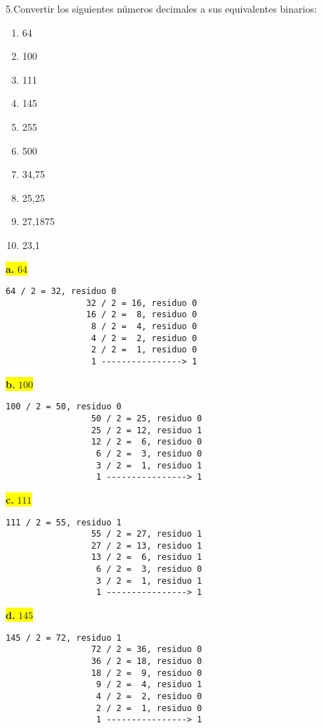 \documentclass[a4paper,12pt]{article}
\begin{document}
	5.Convertir los siguientes números decimales a sus equivalentes binarios:
		\begin{enumerate}
			\item 64 
			\item 100 
			\item 111 
			\item 145 
			\item 255 
			\item 500 
			\item 34,75 
			\item 25,25 
			\item 27,1875 
			\item 23,1
		\end{enumerate}
	
		\newpage
		\begin{center}
			\colorbox{yellow}{{\textbf{a.} $64$}}
			\begin{Verbatim}[formatcom=\centering]
				64 / 2 = 32, residuo 0
				32 / 2 = 16, residuo 0
				16 / 2 =  8, residuo 0
				 8 / 2 =  4, residuo 0
				 4 / 2 =  2, residuo 0
				 2 / 2 =  1, residuo 0
				 1 ----------------> 1
			\end{Verbatim}
		\hspace{1.7cm}
		\end{center}
		\begin{center}
			\colorbox{yellow}{{\textbf{b.} $100$}}
			\begin{Verbatim}[formatcom=\centering]
				100 / 2 = 50, residuo 0
				 50 / 2 = 25, residuo 0
				 25 / 2 = 12, residuo 1
				 12 / 2 =  6, residuo 0
				  6 / 2 =  3, residuo 0
				  3 / 2 =  1, residuo 1
				  1 ----------------> 1
			\end{Verbatim}
			\hspace{1.7cm}
		\end{center}
		\begin{center}
			\colorbox{yellow}{{\textbf{c.} $111$}}
			\begin{Verbatim}[formatcom=\centering]
				111 / 2 = 55, residuo 1
				 55 / 2 = 27, residuo 1
				 27 / 2 = 13, residuo 1
				 13 / 2 =  6, residuo 1
				  6 / 2 =  3, residuo 0
				  3 / 2 =  1, residuo 1
				  1 ----------------> 1
			\end{Verbatim}
			\hspace{1.7cm}
		\end{center}
		\begin{center}
			\colorbox{yellow}{{\textbf{d.} $145$}}
			\begin{Verbatim}[formatcom=\centering]
				145 / 2 = 72, residuo 1
				 72 / 2 = 36, residuo 0
				 36 / 2 = 18, residuo 0
				 18 / 2 =  9, residuo 0
				  9 / 2 =  4, residuo 1
			   	  4 / 2 =  2, residuo 0
			   	  2 / 2 =  1, residuo 0
				  1 ----------------> 1
			\end{Verbatim}
			\hspace{1.7cm}
		\end{center}
\end{document}

